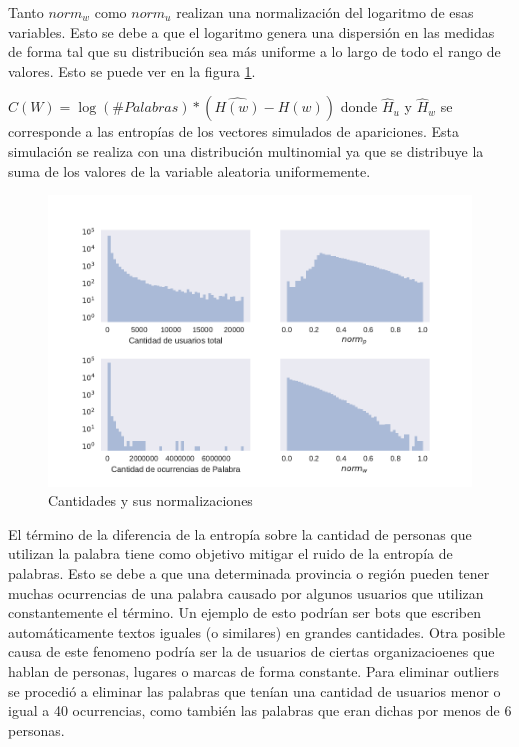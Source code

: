 Tanto $norm_{w}$ como $norm_{u}$ realizan una normalización del logaritmo de esas variables. Esto se debe a que el logaritmo genera una dispersión en las medidas de forma tal que su distribución sea más uniforme a lo largo de todo el rango de valores. Esto se puede ver en la figura \ref{fig:cantNorms}.

$C(W) = \log(\#Palabras) * (\widehat{ H(w)} -  H(w)) $  donde
$\widehat{H}_{u}$ y $\widehat{H}_{w}$ se corresponde a las entropías de los vectores simulados de apariciones.
Esta simulación se realiza con una distribución multinomial ya que se distribuye la suma de los valores de la variable aleatoria uniformemente. 

\begin{figure}[!ht]
\centering
\includegraphics[width=1.0\textwidth]{./images/cantNorms.pdf}
\caption{Cantidades y sus normalizaciones} 
\label{fig:cantNorms} 
\end{figure}

El término de la diferencia de la entropía sobre la cantidad de personas que utilizan la palabra tiene como objetivo mitigar el ruido de la entropía de palabras. Esto se debe a que una determinada provincia  o región pueden tener muchas ocurrencias de una palabra causado por algunos usuarios que utilizan constantemente el término. Un ejemplo de esto podrían ser bots que escriben automáticamente textos iguales (o similares) en grandes cantidades. Otra posible causa de este fenomeno podría ser la de usuarios de ciertas organizacioenes que hablan de personas, lugares o marcas de forma constante. 
Para eliminar outliers se procedió a eliminar las palabras que tenían una cantidad de usuarios menor o igual a 40 ocurrencias, como también las palabras que eran dichas por menos de 6 personas. 


